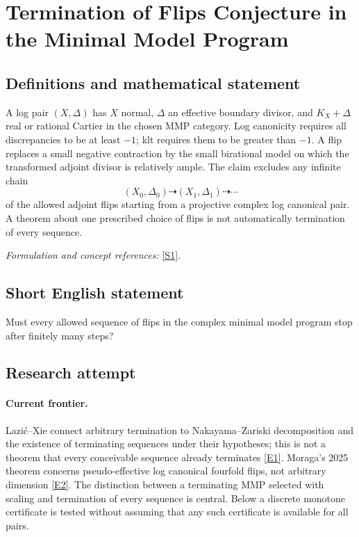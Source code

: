\documentclass[11pt,a4paper]{article}
\numberwithin{equation}{section}
\newcommand{\sref}[2]{\hyperlink{source:#1:#2}{[S#2]}}
\newcommand{\eref}[2]{\hyperlink{extra:#1:#2}{[E#2]}}
\newif\ifshowcatalogue
\newcommand{\cataloguescope}[1]{\ifshowcatalogue
 \paragraph{Exact scope in the supplied catalogue.}
 \begin{quote}\small #1\end{quote}\fi}
\begin{document}
\setcounter{section}{0}
\section*{\texorpdfstring{Termination of Flips Conjecture in the Minimal Model Program}{Termination of Flips Conjecture in the Minimal Model Program}}\label{30006709}
\subsection{Definitions and mathematical statement}
A log pair $(X,\Delta)$ has $X$ normal, $\Delta$ an effective boundary divisor, and $K_X+\Delta$ real or rational Cartier in the chosen MMP category. Log canonicity requires all discrepancies to be at least $-1$; klt requires them to be greater than $-1$. A flip replaces a small negative contraction by the small birational model on which the transformed adjoint divisor is relatively ample. The claim excludes any infinite chain
\[
 (X_0,\Delta_0)\dashrightarrow(X_1,\Delta_1)\dashrightarrow\cdots
\]
of the allowed adjoint flips starting from a projective complex log canonical pair. A theorem about one prescribed choice of flips is not automatically termination of every sequence.
\par\smallskip\textit{Formulation and concept references:} \sref{30006709}{1}.
\cataloguescope{Prove that there is no infinite sequence of flips in the minimal model program: for a projective log canonical (or klt) pair over the complex numbers, every sequence of (K\_X + Delta)-flips terminates after finitely many steps, in every dimension.}
\subsection{Short English statement}
Must every allowed sequence of flips in the complex minimal model program stop after finitely many steps?
\subsection{Research attempt}

\paragraph{Current frontier.}
Lazi\'c--Xie connect arbitrary termination to Nakayama--Zariski decomposition
and the existence of terminating sequences under their hypotheses; this
is not a theorem that every conceivable sequence already terminates
\eref{30006709}{1}. Moraga's 2025 theorem concerns pseudo-effective log canonical
fourfold flips, not arbitrary dimension \eref{30006709}{2}.
The distinction between a terminating MMP selected with scaling and
termination of every sequence is central. Below a discrete monotone
certificate is tested without assuming that any such certificate is
available for all pairs.
\end{document}
